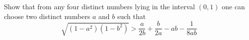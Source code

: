 Show that from any four distinct numbers lying in the interval $(0,1)$ one can choose two distinct numbers $a$ and $b$ such that
$$\sqrt{(1-a^2)(1-b^2)} > \frac{a}{2b}+\frac{b}{2a}-ab-\frac{1}{8ab} $$